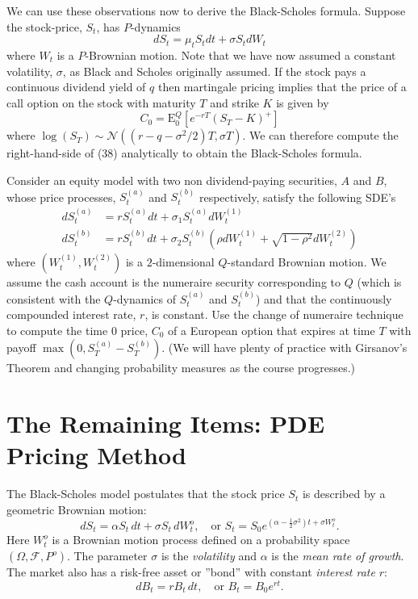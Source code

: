 We can use these observations now to derive the Black-Scholes formula. Suppose the stock-price, $S_t$, has $P$-dynamics
\[dS_t = \mu_t S_t dt + \sigma S_t dW_t\]
where $W_t$ is a $P$-Brownian motion. Note that we have now assumed a constant volatility, $\sigma$, as Black and Scholes originally assumed. If the stock pays a continuous dividend yield of $q$ then martingale pricing implies that the price of a call option on the stock with maturity $T$ and strike $K$ is given by
\[C_0 = \mathrm{E}_0^Q\left[e^{-rT}(S_T-K)^+\right] \tag{38}\]
where $\log(S_T)\sim \mathcal{N}\left((r-q-\sigma^2/2)T, \sigma T\right)$. We can therefore compute the right-hand-side of (38) analytically to obtain the Black-Scholes formula.

\begin{example}
Consider an equity model with two non dividend-paying securities, $A$ and $B$, whose price processes, $S_t^{(a)}$ and $S_t^{(b)}$ respectively, satisfy the following SDE's
\begin{align*}
dS_t^{(a)} &= r S_t^{(a)} dt + \sigma_1 S_t^{(a)} dW_t^{(1)} \\
dS_t^{(b)} &= r S_t^{(b)} dt + \sigma_2 S_t^{(b)} \left(\rho dW_t^{(1)} + \sqrt{1-\rho^2} dW_t^{(2)}\right)
\end{align*}
where $(W_t^{(1)}, W_t^{(2)})$ is a $2$-dimensional $Q$-standard Brownian motion. We assume the cash account is the numeraire security corresponding to $Q$ (which is consistent with the $Q$-dynamics of $S_t^{(a)}$ and $S_t^{(b)}$) and that the continuously compounded interest rate, $r$, is constant. Use the change of numeraire technique to compute the time $0$ price, $C_0$ of a European option that expires at time $T$ with payoff $\max (0, S_T^{(a)}-S_T^{(b)})$. (We will have plenty of practice with Girsanov's Theorem and changing probability measures as the course progresses.)
\end{example}

\section{The Remaining Items: PDE Pricing Method}
The Black-Scholes model postulates that the stock price $S_{t}$ is described by a geometric Brownian motion:
\begin{equation*}
dS_{t}=\alpha S_{t}\, dt+\sigma S_{t}\, dW^{o}_{t},\quad \text{or } S_{t}=S_{0}e^{(\alpha-\frac{1}{2}\sigma^{2})t+\sigma W^{o}_{t}}.
\end{equation*}
Here $W^{o}_{t}$ is a Brownian motion process defined on a probability space $(\Omega,\mathcal{F},P^{o})$. The parameter $\sigma$ is the \textit{volatility} and $\alpha$ is the \textit{mean rate of growth}. The market also has a risk-free asset or ''bond'' with constant \textit{interest rate} $r$:
\begin{equation*}
dB_{t}=rB_{t}\, dt,\quad \text{or } B_{t}=B_{0}e^{rt}.
\end{equation*}

